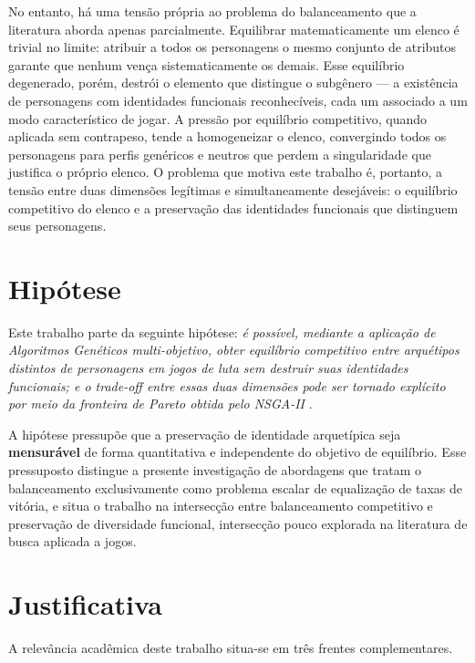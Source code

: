 No entanto, há uma tensão própria ao problema do balanceamento que a literatura aborda apenas parcialmente. Equilibrar matematicamente um elenco é trivial no limite: atribuir a todos os personagens o mesmo conjunto de atributos garante que nenhum vença sistematicamente os demais. Esse equilíbrio degenerado, porém, destrói o elemento que distingue o subgênero --- a existência de personagens com identidades funcionais reconhecíveis, cada um associado a um modo característico de jogar. A pressão por equilíbrio competitivo, quando aplicada sem contrapeso, tende a homogeneizar o elenco, convergindo todos os personagens para perfis genéricos e neutros que perdem a singularidade que justifica o próprio elenco. O problema que motiva este trabalho é, portanto, a tensão entre duas dimensões legítimas e simultaneamente desejáveis: o equilíbrio competitivo do elenco e a preservação das identidades funcionais que distinguem seus personagens.

\section{Hipótese}

Este trabalho parte da seguinte hipótese: \textit{é possível, mediante a aplicação de Algoritmos Genéticos multi-objetivo, obter equilíbrio competitivo entre arquétipos distintos de personagens em jogos de luta sem destruir suas identidades funcionais; e o trade-off entre essas duas dimensões pode ser tornado explícito por meio da fronteira de Pareto obtida pelo NSGA-II} \cite{deb2002nsga}.

A hipótese pressupõe que a preservação de identidade arquetípica seja \textbf{mensurável} de forma quantitativa e independente do objetivo de equilíbrio. Esse pressuposto distingue a presente investigação de abordagens que tratam o balanceamento exclusivamente como problema escalar de equalização de taxas de vitória, e situa o trabalho na intersecção entre balanceamento competitivo e preservação de diversidade funcional, intersecção pouco explorada na literatura de busca aplicada a jogos.

\section{Justificativa}

A relevância acadêmica deste trabalho situa-se em três frentes complementares.

